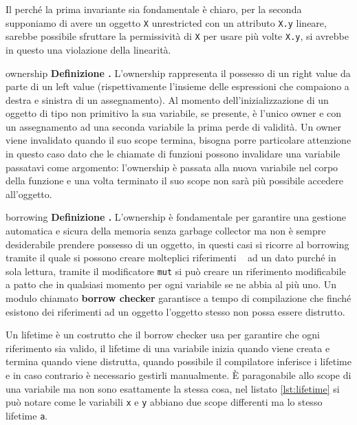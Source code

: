 \documentclass[Lau,binding=0.6cm]{sapthesis}
\newenvironment{myDefinition}[2]{ \begin{Definizione}[adjusted title=#1]{}{#2}
    \textbf{Definizione \thetcbcounter.} }{\end{Definizione}}
\newcommand{\textcode}[1]{\colorbox{backcolour}{\texttt{#1}}}
\begin{document}
Il perché la prima invariante sia fondamentale è chiaro, per la seconda supponiamo di avere un oggetto \texttt{X} unrestricted con un attributo \texttt{X.y} lineare, sarebbe possibile sfruttare la permissività di \texttt{X} per usare più volte \texttt{X.y}, si avrebbe in questo una violazione della linearità.

\begin{myDefinition}{Ownership}{ownership}
    L'ownership rappresenta il possesso di un right value da parte di un left value (rispettivamente l'insieme delle espressioni che compaiono a destra e sinistra di un assegnamento). Al momento dell'inizializzazione di un oggetto di tipo non primitivo la sua variabile, se presente, è l'unico owner e con un assegnamento ad una seconda variabile la prima perde di validità. Un owner viene invalidato quando il suo scope termina, bisogna porre particolare attenzione in questo caso dato che le chiamate di funzioni possono invalidare una variabile passatavi come argomento: l'ownership è passata alla nuova variabile nel corpo della funzione e una volta terminato il suo scope non sarà più possibile accedere all'oggetto. 

    
\end{myDefinition}

\begin{myDefinition}{Borrowing}{borrowing}
  L'ownership è fondamentale per garantire una gestione automatica e sicura della memoria senza garbage collector ma non è sempre desiderabile prendere possesso di un oggetto, in questi casi si ricorre al borrowing tramite il quale si possono creare molteplici  riferimenti ~\cite[4.2]{rust:language} ad un dato purché in sola lettura, tramite il modificatore \textcode{mut} si può creare un riferimento modificabile a patto che in qualsiasi momento per ogni variabile se ne abbia al più uno. Un modulo chiamato \textbf{borrow checker} garantisce a tempo di compilazione che finché esistono dei riferimenti ad un oggetto l'oggetto stesso non possa essere distrutto. 

    
\end{myDefinition}

Un lifetime è un costrutto che il borrow checker usa per garantire che ogni riferimento sia valido, il lifetime di una variabile inizia quando viene creata e termina quando viene distrutta, quando possibile il compilatore inferisce i lifetime e in caso contrario è necessario gestirli manualmente. È paragonabile allo scope di una variabile ma non sono esattamente la stessa cosa, nel listato \ref{lst:lifetime} si può notare come le variabili \textcode{x} e \textcode{y} abbiano due scope differenti ma lo stesso lifetime \textcode{\textquotesingle a}.
  
\end{document}

